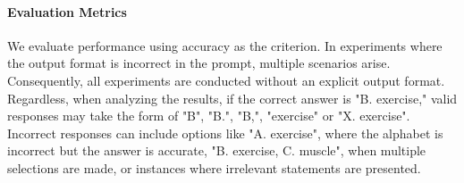 \documentclass{article}
\begin{document}



\paragraph{\textbf{Evaluation Metrics}} %
We evaluate performance using accuracy as the criterion. In experiments where the output format is incorrect in the prompt, multiple scenarios arise.
Consequently, all experiments are conducted without an explicit output format. Regardless, when analyzing the results, if the correct answer is "B. exercise," valid responses may take the form of "B", "B.", "B,", "exercise" or "X. exercise". Incorrect responses can include options like "A. exercise", where the alphabet is incorrect but the answer is accurate, "B. exercise, C. muscle", when multiple selections are made, or instances where irrelevant statements are presented.
\end{document}
